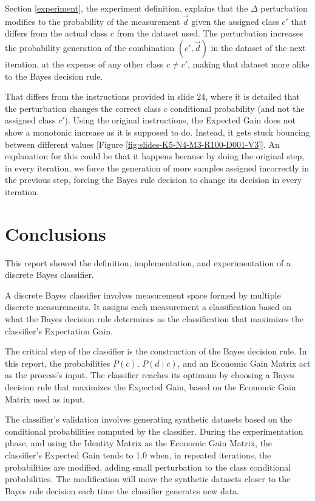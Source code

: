 \documentclass[letterpaper, conference]{IEEEtran}
\begin{document}
Section \ref{experiment}, the experiment definition, explains that the $\Delta$ perturbation modifies to the probability of the measurement $\vec{d}$ given the assigned class $c'$ that differs from the actual class $c$ from the dataset used. The perturbation increases the probability generation of the combination $(c', \vec{d})$ in the dataset of the next iteration, at the expense of any other class $c \neq c'$, making that dataset more alike to the Bayes decision rule.

That differs from the instructions provided in \cite{midterm-project} slide 24, where it is detailed that the perturbation changes the correct class $c$ conditional probability (and not the assigned class $c'$). Using the original instructions, the Expected Gain does not show a monotonic increase as it is supposed to do. Instead, it gets stuck bouncing between different values [Figure \ref{fig:slides-K5-N4-M3-R100-D001-V3}]. An explanation for this could be that it happens because by doing the original step, in every iteration, we force the generation of more samples assigned incorrectly in the previous step, forcing the Bayes rule decision to change its decision in every iteration.



\section{Conclusions}

This report showed the definition, implementation, and experimentation of a discrete Bayes classifier.

A discrete Bayes classifier involves measurement space formed by multiple discrete measurements. It assigns each measurement a classification based on what the Bayes decision rule determines as the classification that maximizes the classifier's Expectation Gain.

The critical step of the classifier is the construction of the Bayes decision rule. In this report, the probabilities $P(c)$, $P(d \mid c)$, and an Economic Gain Matrix act as the process's input. The classifier reaches its optimum by choosing a Bayes decision rule that maximizes the Expected Gain, based on the Economic Gain Matrix used as input.

The classifier's validation involves generating synthetic datasets based on the conditional probabilities computed by the classifier. During the experimentation phase, and using the Identity Matrix as the Economic Gain Matrix, the classifier's Expected Gain tends to 1.0 when, in repeated iterations, the probabilities are modified, adding small perturbation to the class conditional probabilities. The modification will move the synthetic datasets closer to the Bayes rule decision each time the classifier generates new data.
\end{document}
